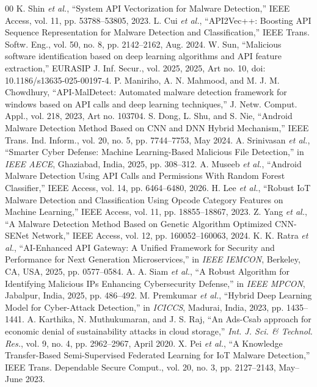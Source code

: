 \documentclass[conference]{IEEEtran}
\begin{document}
\begingroup
\scriptsize
\begin{thebibliography}{00}
 K. Shin \textit{et al.}, ``System API Vectorization for Malware Detection,'' IEEE Access, vol. 11, pp. 53788--53805, 2023.
 L. Cui \textit{et al.}, ``API2Vec++: Boosting API Sequence Representation for Malware Detection and Classification,'' IEEE Trans. Softw. Eng., vol. 50, no. 8, pp. 2142--2162, Aug. 2024.
 W. Sun, ``Malicious software identification based on deep learning algorithms and API feature extraction,'' EURASIP J. Inf. Secur., vol. 2025, 2025, Art no. 10, doi: 10.1186/s13635-025-00197-4.
 P. Maniriho, A. N. Mahmood, and M. J. M. Chowdhury, ``API-MalDetect: Automated malware detection framework for windows based on API calls and deep learning techniques,'' J. Netw. Comput. Appl., vol. 218, 2023, Art no. 103704.
 S. Dong, L. Shu, and S. Nie, ``Android Malware Detection Method Based on CNN and DNN Hybrid Mechanism,'' IEEE Trans. Ind. Inform., vol. 20, no. 5, pp. 7744--7753, May 2024.
 A. Srinivasan \textit{et al.}, ``Smarter Cyber Defense: Machine Learning-Based Malicious File Detection,'' in \textit{IEEE AECE}, Ghaziabad, India, 2025, pp. 308--312.
 A. Museeb \textit{et al.}, ``Android Malware Detection Using API Calls and Permissions With Random Forest Classifier,'' IEEE Access, vol. 14, pp. 6464--6480, 2026.
 H. Lee \textit{et al.}, ``Robust IoT Malware Detection and Classification Using Opcode Category Features on Machine Learning,'' IEEE Access, vol. 11, pp. 18855--18867, 2023.
 Z. Yang \textit{et al.}, ``A Malware Detection Method Based on Genetic Algorithm Optimized CNN-SENet Network,'' IEEE Access, vol. 12, pp. 160052--160063, 2024.
 K. K. Ratra \textit{et al.}, ``AI-Enhanced API Gateway: A Unified Framework for Security and Performance for Next Generation Microservices,'' in \textit{IEEE IEMCON}, Berkeley, CA, USA, 2025, pp. 0577--0584.
 A. A. Siam \textit{et al.}, ``A Robust Algorithm for Identifying Malicious IPs Enhancing Cybersecurity Defense,'' in \textit{IEEE MPCON}, Jabalpur, India, 2025, pp. 486--492.
 M. Premkumar \textit{et al.}, ``Hybrid Deep Learning Model for Cyber-Attack Detection,'' in \textit{ICICCS}, Madurai, India, 2023, pp. 1435--1441.
 A. Karthika, N. Muthukumaran, and J. S. Raj, ``An Ads-Csab approach for economic denial of sustainability attacks in cloud storage,'' \textit{Int. J. Sci. \& Technol. Res.}, vol. 9, no. 4, pp. 2962--2967, April 2020.
 X. Pei \textit{et al.}, ``A Knowledge Transfer-Based Semi-Supervised Federated Learning for IoT Malware Detection,'' IEEE Trans. Dependable Secure Comput., vol. 20, no. 3, pp. 2127--2143, May--June 2023.

\end{thebibliography}
\end{document}
